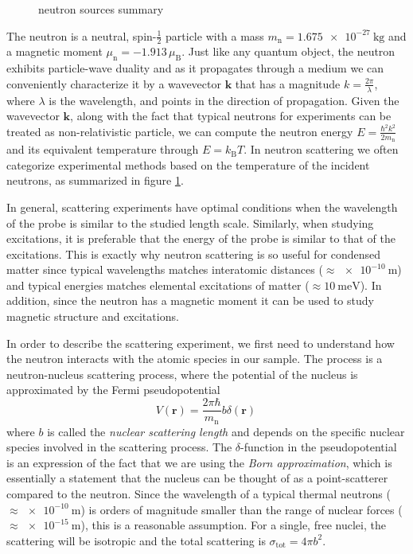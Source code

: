 \begin{figure}
	\centering
	\caption[Neutron Sources]{neutron sources summary}
	\label{fig:neutron_sources}
\end{figure}

The neutron is a neutral, spin-$\frac{1}{2}$ particle with a mass $m_\text{n} = \SI{1.675e-27}{\kilo\gram}$ and a magnetic moment $\mu_\text{n} = -1.913 \, \mu_\text{B}$. Just like any quantum object, the neutron exhibits particle-wave duality and as it propagates through a medium we can conveniently characterize it by a wavevector $\bm{k}$ that has a magnitude $k = \frac{2\pi}{\lambda}$, where $\lambda$ is the wavelength, and points in the direction of propagation. Given the wavevector $\bm{k}$, along with the fact that typical neutrons for experiments can be treated as non-relativistic particle, we can compute the neutron energy $E = \frac{\hbar^2 k^2}{2m_\text{n}}$ and its equivalent temperature through $E = k_\text{B}T$. In neutron scattering we often categorize experimental methods based on the temperature of the incident neutrons, as summarized in figure \ref{fig:neutron_sources}. 

In general, scattering experiments have optimal conditions when the wavelength of the probe is similar to the studied length scale. Similarly, when studying excitations, it is preferable that the energy of the probe is similar to that of the excitations. This is exactly why neutron scattering is so useful for condensed matter since typical wavelengths matches interatomic distances ($\approx \SI{e-10}{\meter}$) and typical energies matches elemental excitations of matter ($\approx \SI{10}{\milli\eV}$). In addition, since the neutron has a magnetic moment it can be used to study magnetic structure and excitations.

In order to describe the scattering experiment, we first need to understand how the neutron interacts with the atomic species in our sample. The process is a neutron-nucleus scattering process, where the potential of the nucleus is approximated by the Fermi pseudopotential
%
\[ V(\bm{r}) = \frac{2\pi \hbar}{m_\text{n}} b \delta (\bm{r}) \, \]
%
where $b$ is called the \emph{nuclear scattering length} and depends on the specific nuclear species involved in the scattering process. The $\delta$-function in the pseudopotential is an expression of the fact that we are using the \emph{Born approximation}, which is essentially a statement that the nucleus can be thought of as a point-scatterer compared to the neutron. Since the wavelength of a typical thermal neutrons ($\approx \SI{e-10}{\meter}$) is orders of magnitude smaller than the range of nuclear forces ($\approx \SI{e-15}{\meter}$), this is a reasonable assumption. For a single, free nuclei, the scattering will be isotropic and the total scattering is $\sigma_\text{tot} = 4\pi b^2$.

